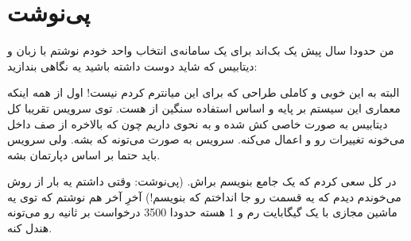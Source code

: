\pagebreak
\section{پی‌نوشت}
من حدودا سال پیش یک بک‌اند برای یک سامانه‌ی انتخاب واحد خودم نوشتم با زبان
 و دیتابیس 
که شاید دوست داشته باشید یه نگاهی بندازید:

\begin{latin}
\noindent
{}
\end{latin}

البته به این خوبی و کاملی طراحی که برای این میانترم کردم نیست! اول از همه اینکه معماری این سیستم
بر پایه و اساس استفاده سنگین از
هست. توی سرویس
تقریبا کل دیتابیس به صورت خاصی کش شده و
به نحوی داریم چون که
بالاخره از صف داخل
می‌خونه تغییرات رو و اعمال می‌کنه. سرویس
به صورت
می‌تونه که
بشه. ولی سرویس
باید حتما بر اساس دپارتمان
بشه.

در کل سعی کردم که یک
جامع بنویسم براش. (پی‌نوشت: وقتی داشتم یه بار از روش می‌خوندم دیدم که یه قسمت رو جا انداختم که بنویسم!)
آخرِ آخر
هم نوشتم که توی یه ماشین مجازی با یک گیگابایت رم و 1 هسته
حدودا 3500 درخواست بر ثانیه رو می‌تونه هندل کنه.